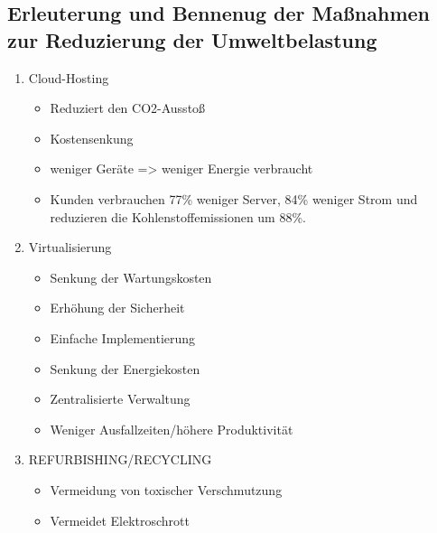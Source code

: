 \documentclass[a4paper]{article}
\begin{document}
    \subsection{\color{red}Erleuterung und Bennenug der Maßnahmen zur Reduzierung der Umweltbelastung}\label{subsec:erleuterung-und-bennenug-der-maßnahmen-zur-reduzierung-der-umweltbelastung}
        \begin{multicols}{2}
            \begin{enumerate}
                \color{magenta}
                \item Cloud-Hosting
                \begin{itemize}
                    \color{blue}
                    \item Reduziert den CO2-Ausstoß
                    \item Kostensenkung
                    \item weniger Geräte => weniger Energie verbraucht
                    \item Kunden verbrauchen 77\% weniger Server, 84\% weniger
                    Strom und reduzieren die Kohlenstoffemissionen um 88\%.
                \end{itemize}
                \color{magenta}
                \item Virtualisierung
                \begin{itemize}
                    \color{blue}
                    \item Senkung der Wartungskosten
                    \item Erhöhung der Sicherheit
                    \item Einfache Implementierung
                    \item Senkung der Energiekosten
                    \item Zentralisierte Verwaltung
                    \item Weniger Ausfallzeiten/höhere Produktivität
                \end{itemize}
                \color{magenta}
                \item REFURBISHING/RECYCLING
                \begin{itemize}
                    \color{blue}
                    \item Vermeidung von toxischer Verschmutzung
                    \item Vermeidet Elektroschrott
                \end{itemize}
                \color{magenta}

\end{enumerate}
\end{multicols}
\end{document}
